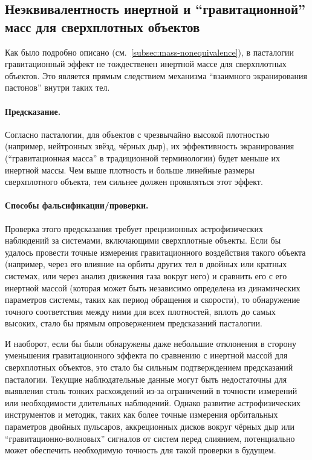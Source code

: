 \documentclass[pdflatex,sn-mathphys-num,referee]{sn-jnl}
\begin{document}
\subsection{Неэквивалентность инертной и ``гравитационной'' масс для сверхплотных объектов}\label{subsec:mass-inequivalence}

Как было подробно описано (см.~\ref{subsec:mass-nonequivalence}), в пасталогии гравитационный эффект не тождественен инертной массе для сверхплотных объектов. Это является прямым следствием механизма ``взаимного экранирования пастонов'' внутри таких тел.

\paragraph{Предсказание.} Согласно пасталогии, для объектов с чрезвычайно высокой плотностью (например, нейтронных звёзд, чёрных дыр), их эффективность экранирования (``гравитационная масса'' в традиционной терминологии) будет меньше их инертной массы. Чем выше плотность и больше линейные размеры сверхплотного объекта, тем сильнее должен проявляться этот эффект.

\paragraph{Способы фальсификации/проверки.} Проверка этого предсказания требует прецизионных астрофизических наблюдений за системами, включающими сверхплотные объекты. Если бы удалось провести точные измерения гравитационного воздействия такого объекта (например, через его влияние на орбиты других тел в двойных или кратных системах, или через анализ движения газа вокруг него) и сравнить его с его инертной массой (которая может быть независимо определена из динамических параметров системы, таких как период обращения и скорости), то обнаружение точного соответствия между ними для всех плотностей, вплоть до самых высоких, стало бы прямым опровержением предсказаний пасталогии.

И наоборот, если бы были обнаружены даже небольшие отклонения в сторону уменьшения гравитационного эффекта по сравнению с инертной массой для сверхплотных объектов, это стало бы сильным подтверждением предсказаний пасталогии. Текущие наблюдательные данные могут быть недостаточны для выявления столь тонких расхождений из-за ограничений в точности измерений или необходимости длительных наблюдений. Однако развитие астрофизических инструментов и методик, таких как более точные измерения орбитальных параметров двойных пульсаров, аккреционных дисков вокруг чёрных дыр или ``гравитационно-волновых'' сигналов от систем перед слиянием, потенциально может обеспечить необходимую точность для такой проверки в будущем.
\end{document}
